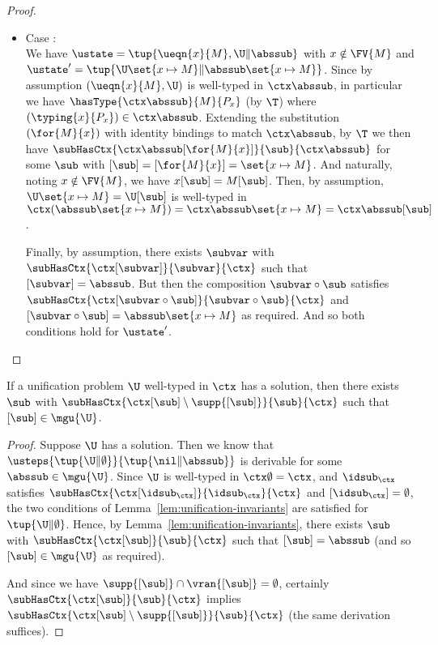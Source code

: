 \begin{proof}
\begin{itemize}
  \item Case : \\
  We have $\ustate = \tup{\ueqn{x}{M}, \U \| \abssub}$ with $x \notin \FV{M}$ and $\ustate' = \tup{\U \set{x \mapsto M} \| \abssub \set{x \mapsto M}}$.
  Since by assumption $(\ueqn{x}{M}, \U)$ is well-typed in $\ctx \abssub$, in particular we have $\hasType{\ctx \abssub}{M}{P_x}$ (by $\T$) where $(\typing{x}{P_x}) \in \ctx \abssub$.
  Extending the substitution $(\for{M}{x})$ with identity bindings to match $\ctx \abssub$, by $\T$ we then have $\subHasCtx{\ctx \abssub [\for{M}{x}]}{\sub}{\ctx \abssub}$ for some $\sub$ with $[\sub] = [\for{M}{x}] = \set{x \mapsto M}$.
  And naturally, noting $x \notin \FV{M}$, we have $x[\sub] = M[\sub]$.
  Then, by assumption, $\U \set{x \mapsto M} = \U[\sub]$ is well-typed in $\ctx (\abssub \set{x \mapsto M}) = \ctx \abssub \set{x \mapsto M} = \ctx \abssub [\sub]$.
  
  Finally, by assumption, there exists $\subvar$ with $\subHasCtx{\ctx[\subvar]}{\subvar}{\ctx}$ such that $[\subvar] = \abssub$.
  But then the composition $\subvar \circ \sub$ satisfies $\subHasCtx{\ctx[\subvar \circ \sub]}{\subvar \circ \sub}{\ctx}$ and $[\subvar \circ \sub] = \abssub \set{x \mapsto M}$ as required.
  And so both conditions hold for $\ustate'$.
\end{itemize}
\end{proof}

\begin{lemma}
\label{lem:unification-existence}
If a unification problem $\U$ well-typed in $\ctx$ has a solution, then there exists $\sub$ with $\subHasCtx{\ctx[\sub] \setminus \supp{[\sub]}}{\sub}{\ctx}$ such that $[\sub] \in \mgu{\U}$.
\end{lemma}

\begin{proof}
Suppose $\U$ has a solution.
Then we know that $\usteps{\tup{\U \| \emptyset}}{\tup{\nil \| \abssub}}$ is derivable for some $\abssub \in \mgu{\U}$.
Since $\U$ is well-typed in $\ctx \emptyset = \ctx$, and $\idsub_{\ctx}$ satisfies $\subHasCtx{\ctx[\idsub_{\ctx}]}{\idsub_{\ctx}}{\ctx}$ and $[\idsub_{\ctx}] = \emptyset$, the two conditions of Lemma~\ref{lem:unification-invariants} are satisfied for $\tup{\U \| \emptyset}$.
Hence, by Lemma~\ref{lem:unification-invariants}, there exists $\sub$ with $\subHasCtx{\ctx[\sub]}{\sub}{\ctx}$ such that $[\sub] = \abssub$ (and so $[\sub] \in \mgu{\U}$ as required).

And since we have $\supp{[\sub]} \cap \vran{[\sub]} = \emptyset$, certainly $\subHasCtx{\ctx[\sub]}{\sub}{\ctx}$ implies $\subHasCtx{\ctx[\sub] \setminus \supp{[\sub]}}{\sub}{\ctx}$ (the same derivation suffices).
\end{proof}

